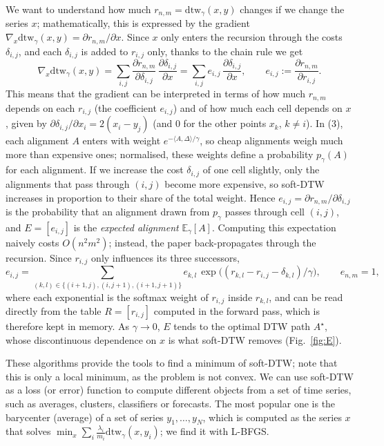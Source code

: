\documentclass[11pt]{article}
\newcommand{\sdtw}{\mathrm{dtw}_\gamma}
\begin{document}
We want to understand how much $r_{n,m}=\sdtw(x,y)$ changes if we change the series $x$; mathematically, this is expressed by the gradient $\nabla_x\sdtw(x,y)=\partial r_{n,m}/\partial x$. Since $x$ only enters the recursion through the costs $\delta_{i,j}$, and each $\delta_{i,j}$ is added to $r_{i,j}$ only, thanks to the chain rule we get
\begin{equation}
\nabla_x\sdtw(x,y)=\sum_{i,j}\frac{\partial r_{n,m}}{\partial \delta_{i,j}}\,\frac{\partial \delta_{i,j}}{\partial x}=\sum_{i,j}e_{i,j}\,\frac{\partial \delta_{i,j}}{\partial x},\qquad e_{i,j}:=\frac{\partial r_{n,m}}{\partial r_{i,j}} .
\end{equation}
This means that the gradient can be interpreted in terms of how much $r_{n,m}$ depends on each $r_{i,j}$ (the coefficient $e_{i,j}$) and of how much each cell depends on $x$, given by $\partial\delta_{i,j}/\partial x_i=2(x_i-y_j)$ (and $0$ for the other points $x_k$, $k\neq i$). In (3), each alignment $A$ enters with weight $e^{-\langle A,\Delta\rangle/\gamma}$, so cheap alignments weigh much more than expensive ones; normalised, these weights define a probability $p_\gamma(A)$ for each alignment. If we increase the cost $\delta_{i,j}$ of one cell slightly, only the alignments that pass through $(i,j)$ become more expensive, so soft-DTW increases in proportion to their share of the total weight. Hence $e_{i,j}=\partial r_{n,m}/\partial\delta_{i,j}$ is the probability that an alignment drawn from $p_\gamma$ passes through cell $(i,j)$, and $E=[e_{i,j}]$ is the \emph{expected alignment} $\mathbb E_\gamma[A]$. Computing this expectation naively costs $O(n^2m^2)$; instead, the paper back-propagates through the recursion. Since $r_{i,j}$ only influences its three successors,
\begin{equation}
e_{i,j}=\sum_{(k,l)\in\{(i+1,j),(i,j+1),(i+1,j+1)\}} e_{k,l}\,\exp\!\big((r_{k,l}-r_{i,j}-\delta_{k,l})/\gamma\big),\qquad e_{n,m}=1,
\end{equation}
where each exponential is the softmax weight of $r_{i,j}$ inside $r_{k,l}$, and can be read directly from the table $R=[r_{i,j}]$ computed in the forward pass, which is therefore kept in memory. As $\gamma\to0$, $E$ tends to the optimal DTW path $A^\star$, whose discontinuous dependence on $x$ is what soft-DTW removes (Fig.~\ref{fig:E}).

These algorithms provide the tools to find a minimum of soft-DTW; note that this is only a local minimum, as the problem is not convex. We can use soft-DTW as a loss (or error) function to compute different objects from a set of time series, such as averages, clusters, classifiers or forecasts. The most popular one is the barycenter (average) of a set of series $y_1,\dots,y_N$, which is computed as the series $x$ that solves $\min_x\sum_i \frac{\lambda_i}{m_i}\sdtw(x,y_i)$; we find it with L-BFGS.
\end{document}
